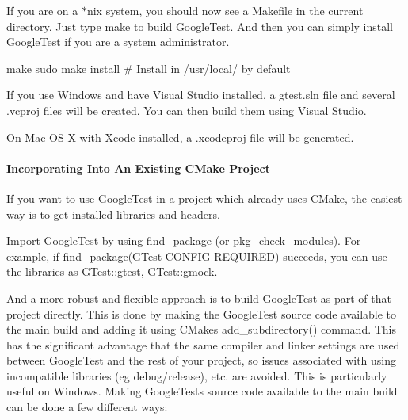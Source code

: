 If you are on a $\ast$nix system, you should now see a Makefile in the current directory. Just type {\ttfamily make} to build Google\+Test. And then you can simply install Google\+Test if you are a system administrator.


\begin{DoxyCode}
make
sudo make install    # Install in /usr/local/ by default
\end{DoxyCode}


If you use Windows and have Visual Studio installed, a {\ttfamily gtest.\+sln} file and several {\ttfamily .vcproj} files will be created. You can then build them using Visual Studio.

On Mac OS X with Xcode installed, a {\ttfamily .xcodeproj} file will be generated.

\paragraph*{Incorporating Into An Existing C\+Make Project}

If you want to use Google\+Test in a project which already uses C\+Make, the easiest way is to get installed libraries and headers.


\begin{DoxyItemize}
\item Import Google\+Test by using {\ttfamily find\+\_\+package} (or {\ttfamily pkg\+\_\+check\+\_\+modules}). For example, if {\ttfamily find\+\_\+package(\+G\+Test C\+O\+N\+F\+I\+G R\+E\+Q\+U\+I\+R\+E\+D)} succeeds, you can use the libraries as {\ttfamily G\+Test\+::gtest}, {\ttfamily G\+Test\+::gmock}.
\end{DoxyItemize}

And a more robust and flexible approach is to build Google\+Test as part of that project directly. This is done by making the Google\+Test source code available to the main build and adding it using C\+Make\textquotesingle{}s {\ttfamily add\+\_\+subdirectory()} command. This has the significant advantage that the same compiler and linker settings are used between Google\+Test and the rest of your project, so issues associated with using incompatible libraries (eg debug/release), etc. are avoided. This is particularly useful on Windows. Making Google\+Test\textquotesingle{}s source code available to the main build can be done a few different ways\+:


